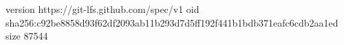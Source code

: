 version https://git-lfs.github.com/spec/v1
oid sha256:c92be8858d93f62df2093ab11b293d7d5ff192f441b1bdb371eafc6cdb2aa1ed
size 87544
